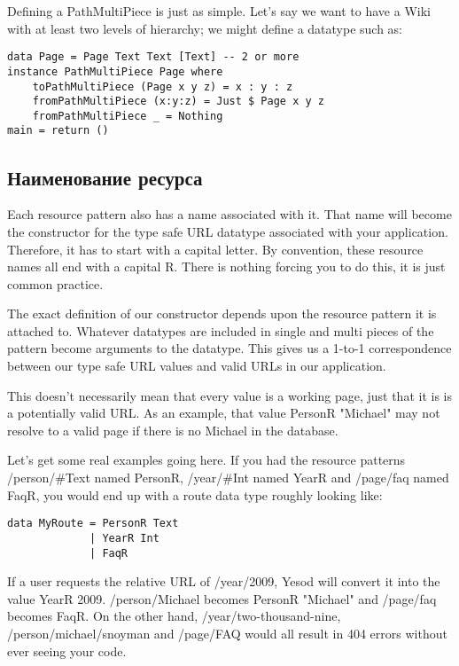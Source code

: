 Defining a PathMultiPiece is just as simple. Let's say we want to have a Wiki with at least two levels of hierarchy; we might define a datatype such as:

\begin{lstlisting}
data Page = Page Text Text [Text] -- 2 or more
instance PathMultiPiece Page where
    toPathMultiPiece (Page x y z) = x : y : z
    fromPathMultiPiece (x:y:z) = Just $ Page x y z
    fromPathMultiPiece _ = Nothing
main = return ()
\end{lstlisting}

\subsection{Наименование ресурса}

Each resource pattern also has a name associated with it. That name
will become the constructor for the type safe URL datatype associated
with your application. Therefore, it has to start with a capital
letter. By convention, these resource names all end with a capital
R. There is nothing forcing you to do this, it is just common
practice.

The exact definition of our constructor depends upon the resource
pattern it is attached to. Whatever datatypes are included in single
and multi pieces of the pattern become arguments to the datatype. This
gives us a 1-to-1 correspondence between our type safe URL values and
valid URLs in our application.

This doesn't necessarily mean that every value is a working page, just
that it is is a potentially valid URL. As an example, that value
PersonR "Michael" may not resolve to a valid page if there is no
Michael in the database.

Let's get some real examples going here. If you had the resource
patterns /person/#Text named PersonR, /year/#Int named YearR and
/page/faq named FaqR, you would end up with a route data type roughly
looking like:

\begin{lstlisting}
data MyRoute = PersonR Text
             | YearR Int
             | FaqR
\end{lstlisting}

If a user requests the relative URL of /year/2009, Yesod will convert
it into the value YearR 2009. /person/Michael becomes PersonR
"Michael" and /page/faq becomes FaqR. On the other hand,
/year/two-thousand-nine, /person/michael/snoyman and /page/FAQ would
all result in 404 errors without ever seeing your code.

